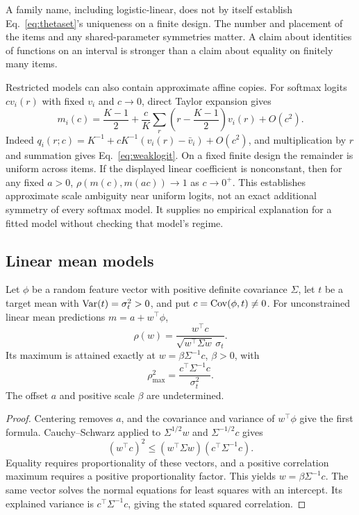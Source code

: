 A family name, including logistic-linear, does not by itself establish Eq.~\eqref{eq:thetaset}'s uniqueness on a finite design.
The number and placement of the items and any shared-parameter symmetries matter.
A claim about identities of functions on an interval is stronger than a claim about equality on finitely many items.

Restricted models can also contain approximate affine copies.
For softmax logits $c v_i(r)$ with fixed $v_i$ and $c\to0$, direct Taylor expansion gives
\begin{equation}\label{eq:weaklogit}
 m_i(c)=\frac{K-1}{2}+\frac cK\sum_r\left(r-\frac{K-1}{2}\right)v_i(r)+O(c^2).
\end{equation}
Indeed $q_i(r;c)=K^{-1}+cK^{-1}(v_i(r)-\bar v_i)+O(c^2)$, and multiplication by $r$ and summation gives Eq.~\eqref{eq:weaklogit}.
On a fixed finite design the remainder is uniform across items.
If the displayed linear coefficient is nonconstant, then for any fixed $a>0$, $\rho(m(c),m(ac))\to1$ as $c\to0^+$.
This establishes approximate scale ambiguity near uniform logits, not an exact additional symmetry of every softmax model.
It supplies no empirical explanation for a fitted model without checking that model's regime.

\subsection{Linear mean models}
\begin{proposition}\label{prop:linear}
Let $\phi$ be a random feature vector with positive definite covariance $\Sigma$, let $t$ be a target mean with $\operatorname{Var}(t)=\sigma_t^2>0$, and put $c=\operatorname{Cov}(\phi,t)\ne0$.
For unconstrained linear mean predictions $m=a+w^\top\phi$,
\[
 \rho(w)=\frac{w^\top c}{\sqrt{w^\top\Sigma w}\,\sigma_t}.
\]
Its maximum is attained exactly at $w=\beta\Sigma^{-1}c$, $\beta>0$, with
\[
 \rho_{\max}^2=\frac{c^\top\Sigma^{-1}c}{\sigma_t^2}.
\]
The offset $a$ and positive scale $\beta$ are undetermined.
\end{proposition}
\begin{proof}
Centering removes $a$, and the covariance and variance of $w^\top\phi$ give the first formula.
Cauchy--Schwarz applied to $\Sigma^{1/2}w$ and $\Sigma^{-1/2}c$ gives
\[
 (w^\top c)^2\le(w^\top\Sigma w)(c^\top\Sigma^{-1}c).
\]
Equality requires proportionality of these vectors, and a positive correlation maximum requires a positive proportionality factor.
This yields $w=\beta\Sigma^{-1}c$.
The same vector solves the normal equations for least squares with an intercept.
Its explained variance is $c^\top\Sigma^{-1}c$, giving the stated squared correlation.
\end{proof}

